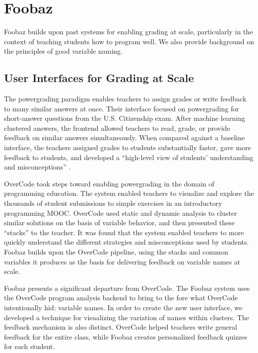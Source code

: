 \section{Foobaz}
Foobaz builds upon past systems for enabling grading at scale, particularly in the context of teaching students how to program well. We also provide background on the principles of good variable naming.

\subsection{User Interfaces for Grading at Scale}
The powergrading paradigm \cite{basupowergrading} enables teachers to assign grades or write feedback to many similar answers at once. Their interface focused on powergrading for short-answer questions from the U.S. Citizenship exam. After machine learning clustered answers, the frontend allowed teachers to read, grade, or provide feedback on similar answers simultaneously. When compared against a baseline interface, the teachers assigned grades to students substantially faster, gave more feedback to students, and developed a ``high-level view of students' understanding and misconceptions'' \cite{basuDivideAndConquer}.

OverCode \cite{overcode} took steps toward enabling powergrading in the domain of programming education. The system enabled teachers to visualize and explore the thousands of student submissions to simple exercises in an introductory programming MOOC. OverCode used static and dynamic analysis to cluster similar solutions on the basis of variable behavior, and then presented these ``stacks'' to the teacher. It was found that the system enabled teachers to more quickly understand the different strategies and misconceptions used by students. Foobaz builds upon the OverCode pipeline, using the stacks and common variables it produces as the basis for delivering feedback on variable names at scale.

Foobaz presents a significant departure from OverCode. The Foobaz system uses the OverCode program analysis backend to bring to the fore what OverCode intentionally hid: variable names. In order to create the new user interface, we developed a technique for visualizing the variation of names within clusters. The feedback mechanism is also distinct. OverCode helped teachers write general feedback for the entire class, while Foobaz creates personalized feedback quizzes for each student.

